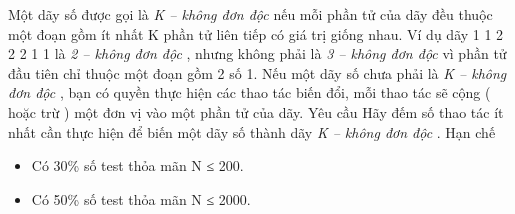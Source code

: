 Một dãy số được gọi là   \textit{    K – không đơn độc   }   nếu mỗi phần tử của dãy đều thuộc một đoạn gồm ít nhất       K      phần tử liên tiếp có giá trị giống nhau. Ví dụ dãy 1 1 2 2 2 1 1 là   \textit{    2 – không đơn độc   }   , nhưng không phải là   \textit{    3 – không đơn độc   }   vì phần tử đầu tiên chỉ thuộc một đoạn gồm 2 số 1. Nếu một dãy số chưa phải là   \textit{    K – không đơn độc   }   , bạn có quyền thực hiện các thao tác biến đổi, mỗi thao tác sẽ cộng ( hoặc trừ ) một đơn vị vào một phần tử của dãy.
Yêu cầu
Hãy đếm số thao tác ít nhất cần thực hiện để biến một dãy số thành dãy   \textit{    K – không đơn độc   }   .
Hạn chế
\begin{itemize}
	\item     Có 30\% số test thỏa mãn N ≤ 200.   
	\item     Có 50\% số test thỏa mãn N ≤ 2000.   
\end{itemize}